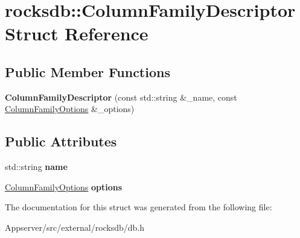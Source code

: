 \hypertarget{structrocksdb_1_1ColumnFamilyDescriptor}{}\section{rocksdb\+:\+:Column\+Family\+Descriptor Struct Reference}
\label{structrocksdb_1_1ColumnFamilyDescriptor}
\subsection*{Public Member Functions}
\begin{DoxyCompactItemize}
\item 
{\bfseries Column\+Family\+Descriptor} (const std\+::string \&\+\_\+name, const \hyperlink{structrocksdb_1_1ColumnFamilyOptions}{Column\+Family\+Options} \&\+\_\+options)\hypertarget{structrocksdb_1_1ColumnFamilyDescriptor_aad46bee2442608b1bfb7f97e8d617956}{}\label{structrocksdb_1_1ColumnFamilyDescriptor_aad46bee2442608b1bfb7f97e8d617956}

\end{DoxyCompactItemize}
\subsection*{Public Attributes}
\begin{DoxyCompactItemize}
\item 
std\+::string {\bfseries name}\hypertarget{structrocksdb_1_1ColumnFamilyDescriptor_ac56618c838230572c4fc5115b8bd080d}{}\label{structrocksdb_1_1ColumnFamilyDescriptor_ac56618c838230572c4fc5115b8bd080d}

\item 
\hyperlink{structrocksdb_1_1ColumnFamilyOptions}{Column\+Family\+Options} {\bfseries options}\hypertarget{structrocksdb_1_1ColumnFamilyDescriptor_a81609dbe0c293b687ef797f1b1709752}{}\label{structrocksdb_1_1ColumnFamilyDescriptor_a81609dbe0c293b687ef797f1b1709752}

\end{DoxyCompactItemize}


The documentation for this struct was generated from the following file\+:\begin{DoxyCompactItemize}
\item 
Appserver/src/external/rocksdb/db.\+h\end{DoxyCompactItemize}
